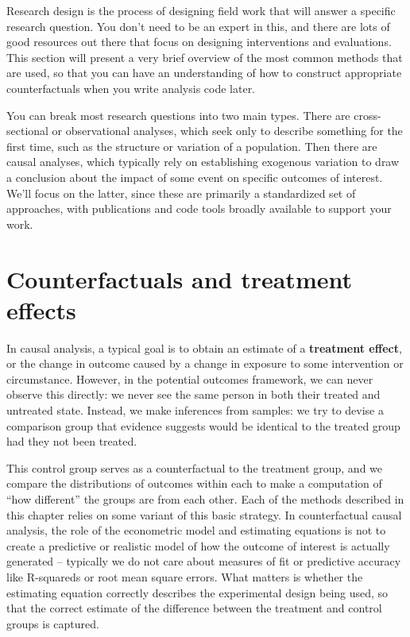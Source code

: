 
\begin{fullwidth}
Research design is the process of designing field work
that will answer a specific research question.
You don't need to be an expert in this,
and there are lots of good resources out there
that focus on designing interventions and evaluations.
This section will present a very brief overview
of the most common methods that are used,
so that you can have an understanding of
how to construct appropriate counterfactuals
when you write analysis code later.

You can break most research questions into two main types.
There are cross-sectional or observational analyses,
which seek only to describe something for the first time,
such as the structure or variation of a population.
Then there are causal analyses,
which typically rely on establishing exogenous variation
to draw a conclusion about the impact of some event
on specific outcomes of interest.
We'll focus on the latter, since these are primarily
a standardized set of approaches, with publications
and code tools broadly available to support your work.
\end{fullwidth}


\section{Counterfactuals and treatment effects}

In causal analysis, a typical goal is to obtain an estimate
of a \textbf{treatment effect}, or the change in outcome
caused by a change in exposure to some intervention or circumstance.\cite{abadie2018econometric}
However, in the potential outcomes framework,
we can never observe this directly:
we never see the same person in both their treated and untreated state.
Instead, we make inferences from samples:
we try to devise a comparison group that evidence suggests
would be identical to the treated group had they not been treated.

This control group serves as a counterfactual to the treatment group,
and we compare the distributions of outcomes within each
to make a computation of ``how different'' the groups are from each other.
Each of the methods described in this chapter
relies on some variant of this basic strategy.
In counterfactual causal analysis,
the role of the econometric model and estimating equations
is not to create a predictive or realistic model
of how the outcome of interest is actually generated --
typically we do not care about measures of fit or predictive accuracy
like R-squareds or root mean square errors.
What matters is whether the estimating equation
correctly describes the experimental design being used,
so that the correct estimate of the difference
between the treatment and control groups is captured.

